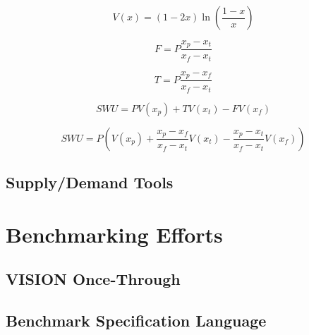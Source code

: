 \begin{equation}\label{eqs:enr-value}
  V(x) = (1 - 2x) \ln \left( \frac{1-x}{x} \right)
\end{equation}

\begin{equation}\label{eqs:enr-feed}
  F = P \frac{x_{p} - x_{t}}{x_{f} - x_{t}}
\end{equation}

\begin{equation}\label{eqs:enr-tails}
  T = P \frac{x_{p} - x_{f}}{x_{f} - x_{t}}
\end{equation}

\begin{equation}\label{eqs:enr-swu}
  SWU = P V(x_{p}) + T V(x_{t}) - F V(x_{f})
\end{equation}

\begin{equation}\label{eqs:enr-swu-p}
  SWU = P \left( V(x_{p}) + \frac{x_{p} - x_{f}}{x_{f} - x_{t}} V(x_{t}) 
        - \frac{x_{p} - x_{t}}{x_{f} - x_{t}} V(x_{f}) \right)
\end{equation}

\subsection{Supply/Demand Tools}

\subsection{\Cyclopts}

\section{Benchmarking Efforts}\label{sec:prev-benchmark}

\subsection{VISION Once-Through}

\subsection{Benchmark Specification Language}
